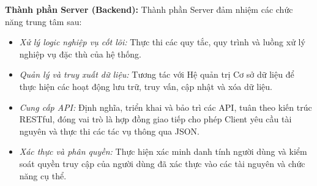 \textbf{Thành phần Server (Backend):} Thành phần Server đảm nhiệm các chức năng trung tâm sau:
\begin{itemize}
    \item \textit{Xử lý logic nghiệp vụ cốt lõi:} Thực thi các quy tắc, quy trình và luồng xử lý nghiệp vụ đặc thù của hệ thống.
    \item \textit{Quản lý và truy xuất dữ liệu:} Tương tác với Hệ quản trị Cơ sở dữ liệu để thực hiện các hoạt động lưu trữ, truy vấn, cập nhật và xóa dữ liệu.
    \item \textit{Cung cấp API:} Định nghĩa, triển khai và bảo trì các API, tuân theo kiến trúc RESTful, đóng vai trò là hợp đồng giao tiếp cho phép Client yêu cầu tài nguyên và thực thi các tác vụ thông qua JSON.
    \item \textit{Xác thực và phân quyền:} Thực hiện xác minh danh tính người dùng và kiểm soát quyền truy cập của người dùng đã xác thực vào các tài nguyên và chức năng cụ thể.
\end{itemize}


